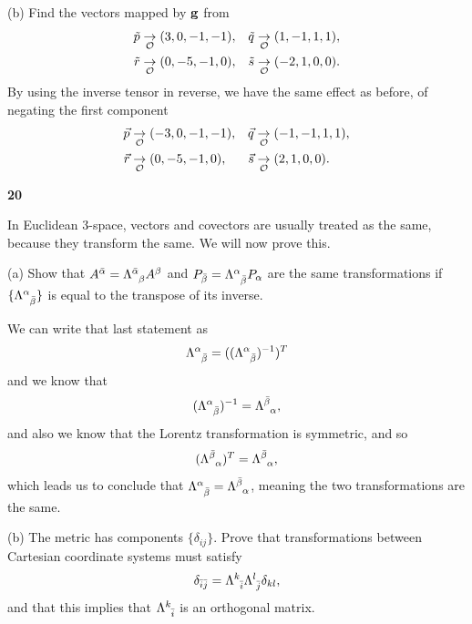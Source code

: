 \documentclass[gr-notes.tex]{subfiles}
\begin{document}
(b)
Find the vectors mapped by $\vb{g}$ from
%
\begin{align*}
  \tilde{p} &\underset{\mathcal{O}}{\to} ( 3,  0, -1, -1), &
  \tilde{q} &\underset{\mathcal{O}}{\to} ( 1, -1,  1,  1), \\
  \tilde{r} &\underset{\mathcal{O}}{\to} ( 0, -5, -1,  0), &
  \tilde{s} &\underset{\mathcal{O}}{\to} (-2,  1,  0,  0).
\end{align*}
%
By using the inverse tensor in reverse, we have the same effect as before, of negating the first component
%
\begin{align*}
  \vec{p} &\underset{\mathcal{O}}{\to} (-3,  0, -1, -1), &
  \vec{q} &\underset{\mathcal{O}}{\to} (-1, -1,  1,  1), \\
  \vec{r} &\underset{\mathcal{O}}{\to} ( 0, -5, -1,  0), &
  \vec{s} &\underset{\mathcal{O}}{\to} ( 2,  1,  0,  0).
\end{align*}


\textbf{20}

In Euclidean 3-space, vectors and covectors are usually treated as the same, because they transform the same. We will now prove this.


(a)
Show that $A^{\bar\alpha} = \tensor{\Lambda}{^{\bar\alpha}_\beta} A^\beta$ and $P_{\bar\beta} = \tensor{\Lambda}{^{\alpha}_{\bar\beta}} P_\alpha$ are the same transformations if $\{ \tensor{\Lambda}{^{\alpha}_{\bar\beta}} \}$ is equal to the transpose of its inverse.

We can write that last statement as
%
\begin{displaymath}
  \tensor{\Lambda}{^{\alpha}_{\bar\beta}} =
  ((\tensor{\Lambda}{^{\alpha}_{\bar\beta}})^{-1})^T
\end{displaymath}
%
and we know that
%
\begin{displaymath}
  (\tensor{\Lambda}{^{\alpha}_{\bar\beta}})^{-1} =
  \tensor{\Lambda}{^{\bar\beta}_{\alpha}},
\end{displaymath}
%
and also we know that the Lorentz transformation is symmetric, and so
%
\begin{displaymath}
  (\tensor{\Lambda}{^{\bar\beta}_{\alpha}})^T =
  \tensor{\Lambda}{^{\bar\beta}_{\alpha}},
\end{displaymath}
%
which leads us to conclude that $\tensor{\Lambda}{^{\alpha}_{\bar\beta}} = \tensor{\Lambda}{^{\bar\beta}_{\alpha}}$, meaning the two transformations are the same.

(b)
The metric has components $\{ \delta_{ij} \}$. Prove that transformations between Cartesian coordinate systems must satisfy
\begin{displaymath}
  \delta_{\bar{i}\bar{j}} =
  \tensor{\Lambda}{^k_{\bar{i}}}
  \tensor{\Lambda}{^l_{\bar{j}}}
  \delta_{kl},
\end{displaymath}
and that this implies that $\tensor{\Lambda}{^k_{\bar{i}}}$ is an orthogonal matrix.
\end{document}
